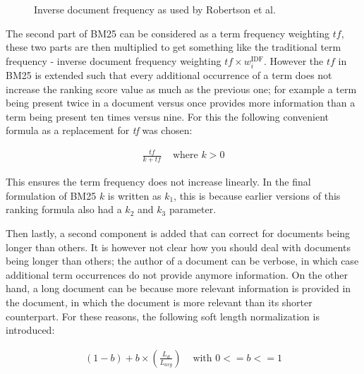 \begin{figure}
	\caption{Inverse document frequency as used by Robertson et al.~\cite{bm25-robertson}}
	\label{idf}
\end{figure}

The second part of BM25 can be considered as a term frequency weighting $tf$, these two parts are then multiplied to get something like the traditional term frequency - inverse document frequency weighting $tf \times w_i^{\text{IDF}}$.
However the $tf$ in BM25 is extended such that every additional occurrence of a term does not increase the ranking score value as much as the previous one; for example a term being present twice in a document versus once provides more information than a term being present ten times versus nine. For this the following convenient formula as a replacement for \textit{tf} was chosen:

\begin{align}
	\frac{tf}{k+tf} & \text{ where } k>0
\end{align}

This ensures the term frequency does not increase linearly. In the final formulation of BM25 $k$ is written as $k_1$, this is because earlier versions of this ranking formula also had a $k_2$ and $k_3$ parameter. 

Then lastly, a second component is added that can correct for documents being longer than others. It is however not clear how you should deal with documents being longer than others; the author of a document can be verbose, in which case additional term occurrences do not provide anymore information. On the other hand, a long document can be because more relevant information is provided in the document, in which the document is more relevant than its shorter counterpart. For these reasons, the following soft length normalization is introduced:

\begin{align}
	\left(1-b\right) + b \times \left(\frac{L_d}{L_{avg}}\right) & \text{ with } 0 <= b <= 1
\end{align}

